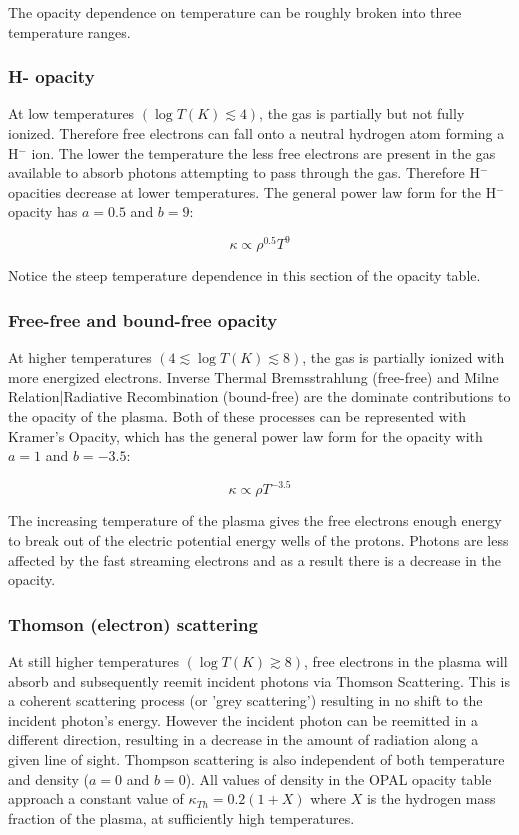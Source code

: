 \documentclass{article}
\begin{document}
The opacity dependence on temperature can be roughly broken into three temperature ranges.

\subsubsection{H- opacity}

At low temperatures $(\log T (K) \lesssim 4)$, the gas is partially but not fully ionized. Therefore free electrons can fall onto a neutral hydrogen atom forming a H$^-$ ion. The lower the temperature the less free electrons are present in the gas available to absorb photons attempting to pass through the gas. Therefore H$^-$ opacities decrease at lower temperatures. The general power law form for the H$^-$ opacity has $a = 0.5$ and $b = 9$:

$$ \kappa \propto \rho^{0.5} T^{9}$$

Notice the steep temperature dependence in this section of the opacity table.

\subsubsection{Free-free and bound-free opacity}

At higher temperatures $(4 \lesssim \log T (K) \lesssim 8)$, the gas is partially ionized with more energized electrons. Inverse Thermal Bremsstrahlung (free-free) and Milne Relation|Radiative Recombination (bound-free) are the dominate contributions to the opacity of the plasma. Both of these processes can be represented with Kramer's Opacity, which has the general power law form for the opacity with $a = 1$ and $b = -3.5$:

$$ \kappa \propto \rho T^{-3.5}$$ 

The increasing temperature of the plasma gives the free electrons enough energy to break out of the electric potential energy wells of the protons. Photons are less affected by the fast streaming electrons and as a result there is a decrease in the opacity.

\subsubsection{Thomson (electron) scattering}

At still higher temperatures $(\log T (K) \gtrsim 8)$, free electrons in the plasma will absorb and subsequently reemit incident photons via Thomson Scattering. This is a coherent scattering process (or 'grey scattering') resulting in no shift to the incident photon's energy. However the incident photon can be reemitted in a different direction, resulting in a decrease in the amount of radiation along a given line of sight. Thompson scattering is also independent of both temperature and density ($a = 0$ and $b = 0$). All values of density in the OPAL opacity table approach a constant value of $\kappa_{Th} = 0.2 (1 + X)$ where $X$ is the hydrogen mass fraction of the plasma, at sufficiently high temperatures.
\end{document}

